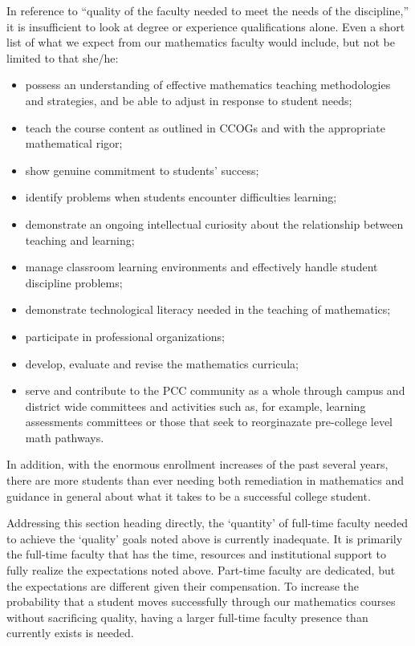 In reference to ``quality of the faculty needed to meet the needs of the discipline,''  it is insufficient to look at degree or experience qualifications alone.  Even a short list of what we expect from our mathematics faculty would include, but not be limited to that she/he:
\begin{itemize}
  \item possess an understanding of effective mathematics teaching methodologies and      strategies, and be able to adjust in response to student needs;
  \item  teach  the course content as outlined in CCOGs and with the appropriate mathematical  rigor;
\item show genuine commitment to students' success;
\item identify problems when students encounter difficulties learning;
\item demonstrate an ongoing intellectual curiosity about the relationship
  between teaching and learning;
\item manage classroom learning environments and effectively handle student
  discipline problems;
\item demonstrate technological literacy needed in the teaching of mathematics;
\item participate in professional organizations;
\item develop, evaluate and revise the mathematics curricula;
\item serve and contribute to the PCC community as a whole through campus and
  district wide committees and activities such as, for example, learning assessments committees or
  those that seek to reorginazate pre-college level math pathways.
\end{itemize}
In addition, with the enormous enrollment increases of the past several years,
there are more students than ever needing both remediation in mathematics and
guidance in general about what it takes to be a successful college student.

Addressing this section heading directly, the `quantity' of full-time faculty
needed to achieve the `quality' goals noted above is currently inadequate.  It
is primarily the full-time faculty that has the time, resources and
institutional support to fully realize the expectations noted above.  Part-time
faculty are dedicated, but the expectations are different given their
compensation.   To increase the probability that a student moves successfully
through our mathematics courses without sacrificing quality, having a larger
full-time faculty presence than currently exists is needed.

